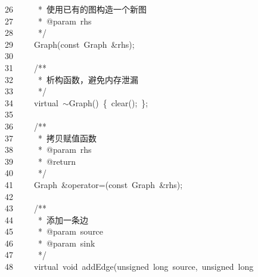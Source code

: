 \documentclass{ctexart}
\newcommand{\hlstd}[1]{\textcolor[rgb]{0.2,0.2,0.2}{#1}}
\newcommand{\hlcom}[1]{\textcolor[rgb]{0.59,0.59,0.59}{#1}}
\newcommand{\hlopt}[1]{\textcolor[rgb]{0.2,0.2,0.2}{#1}}
\newcommand{\hllin}[1]{\textcolor[rgb]{0.59,0.59,0.59}{#1}}
\newcommand{\hlkwb}[1]{\textcolor[rgb]{0.63,0,0.31}{#1}}
\newcommand{\hlkwc}[1]{\textcolor[rgb]{0,0.63,0.31}{#1}}
\newcommand{\hlkwd}[1]{\textcolor[rgb]{0.78,0.23,0.41}{#1}}
\begin{document}
\hllin{26\ }\hlcom{}\hlstd{\ \ \ \ \ }\hlcom{{*}\ 使用已有的图构造一个新图}\\
\hllin{27\ }\hlcom{}\hlstd{\ \ \ \ \ }\hlcom{{*}\ @param\ rhs}\\
\hllin{28\ }\hlcom{}\hlstd{\ \ \ \ \ }\hlcom{{*}/}\hlstd{}\\
\hllin{29\ }\hlstd{}\hlstd{\ \ \ \ }\hlstd{}\hlkwd{Graph}\hlstd{}\hlopt{(}\hlstd{}\hlkwb{const\ }\hlstd{Graph\ }\hlopt{\&}\hlstd{rhs}\hlopt{);}\\
\hllin{30\ }\hlstd{}\\
\hllin{31\ }\hlstd{}\hlstd{\ \ \ \ }\hlstd{}\hlcom{/{*}{*}}\\
\hllin{32\ }\hlcom{}\hlstd{\ \ \ \ \ }\hlcom{{*}\ 析构函数，避免内存泄漏}\\
\hllin{33\ }\hlcom{}\hlstd{\ \ \ \ \ }\hlcom{{*}/}\hlstd{}\\
\hllin{34\ }\hlstd{}\hlstd{\ \ \ \ }\hlstd{}\hlkwc{virtual\ }\hlstd{}\hlopt{$\sim$}\hlstd{}\hlkwd{Graph}\hlstd{}\hlopt{()\ \{\ }\hlstd{}\hlkwd{clear}\hlstd{}\hlopt{();\ \};}\\
\hllin{35\ }\hlstd{}\\
\hllin{36\ }\hlstd{}\hlstd{\ \ \ \ }\hlstd{}\hlcom{/{*}{*}}\\
\hllin{37\ }\hlcom{}\hlstd{\ \ \ \ \ }\hlcom{{*}\ 拷贝赋值函数}\\
\hllin{38\ }\hlcom{}\hlstd{\ \ \ \ \ }\hlcom{{*}\ @param\ rhs}\\
\hllin{39\ }\hlcom{}\hlstd{\ \ \ \ \ }\hlcom{{*}\ @return}\\
\hllin{40\ }\hlcom{}\hlstd{\ \ \ \ \ }\hlcom{{*}/}\hlstd{}\\
\hllin{41\ }\hlstd{}\hlstd{\ \ \ \ }\hlstd{Graph\ }\hlopt{\&}\hlstd{}\hlkwc{operator}\hlstd{}\hlopt{=(}\hlstd{}\hlkwb{const\ }\hlstd{Graph\ }\hlopt{\&}\hlstd{rhs}\hlopt{);}\\
\hllin{42\ }\hlstd{}\\
\hllin{43\ }\hlstd{}\hlstd{\ \ \ \ }\hlstd{}\hlcom{/{*}{*}}\\
\hllin{44\ }\hlcom{}\hlstd{\ \ \ \ \ }\hlcom{{*}\ 添加一条边}\\
\hllin{45\ }\hlcom{}\hlstd{\ \ \ \ \ }\hlcom{{*}\ @param\ source}\\
\hllin{46\ }\hlcom{}\hlstd{\ \ \ \ \ }\hlcom{{*}\ @param\ sink}\\
\hllin{47\ }\hlcom{}\hlstd{\ \ \ \ \ }\hlcom{{*}/}\hlstd{}\\
\hllin{48\ }\hlstd{}\hlstd{\ \ \ \ }\hlstd{}\hlkwc{virtual\ }\hlstd{}\hlkwb{void\ }\hlstd{}\hlkwd{addEdge}\hlstd{}\hlopt{(}\hlstd{}\hlkwb{unsigned\ long\ }\hlstd{source}\hlopt{,\ }\hlstd{}\hlkwb{unsigned\ long\ }\Righttorque\\
\end{document}
